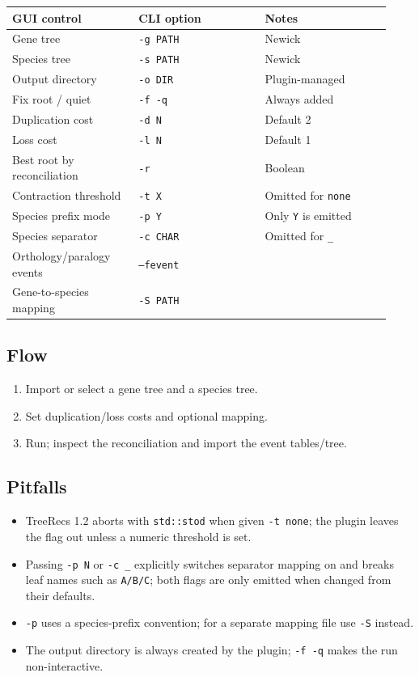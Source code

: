 \documentclass[11pt]{report}
\begin{document}
{\footnotesize
\begin{longtable}{@{}>{\raggedright\arraybackslash}p{0.31\linewidth}>{\raggedright\arraybackslash}p{0.31\linewidth}>{\raggedright\arraybackslash}p{0.31\linewidth}@{}}
\toprule
GUI control & CLI option & Notes \\
\midrule
\endhead
Gene tree & \texttt{-g PATH} & Newick \\
Species tree & \texttt{-s PATH} & Newick \\
Output directory & \texttt{-o DIR} & Plugin-managed \\
Fix root / quiet & \texttt{-f -q} & Always added \\
Duplication cost & \texttt{-d N} & Default 2 \\
Loss cost & \texttt{-l N} & Default 1 \\
Best root by reconciliation & \texttt{-r} & Boolean \\
Contraction threshold & \texttt{-t X} & Omitted for \texttt{none} \\
Species prefix mode & \texttt{-p Y} & Only \texttt{Y} is emitted \\
Species separator & \texttt{-c CHAR} & Omitted for \texttt{\_\allowbreak } \\
Orthology/paralogy events & \texttt{--fevent} &  \\
Gene-to-species mapping & \texttt{-S PATH} &  \\
\bottomrule
\end{longtable}
}

\subsection{Flow}

\begin{enumerate}
  \item Import or select a gene tree and a species tree.
  \item Set duplication/loss costs and optional mapping.
  \item Run; inspect the reconciliation and import the event tables/tree.
\end{enumerate}

\subsection{Pitfalls}

\begin{itemize}
  \item TreeRecs 1.2 aborts with \texttt{std::stod} when given \texttt{-t none}; the plugin leaves the flag out unless a numeric threshold is set.
  \item Passing \texttt{-p N} or \texttt{-c \_\allowbreak } explicitly switches separator mapping on and breaks leaf names such as \texttt{A/\allowbreak B/\allowbreak C}; both flags are only emitted when changed from their defaults.
  \item \texttt{-p} uses a species-prefix convention; for a separate mapping file use \texttt{-S} instead.
  \item The output directory is always created by the plugin; \texttt{-f -q} makes the run non-interactive.
\end{itemize}
\end{document}
